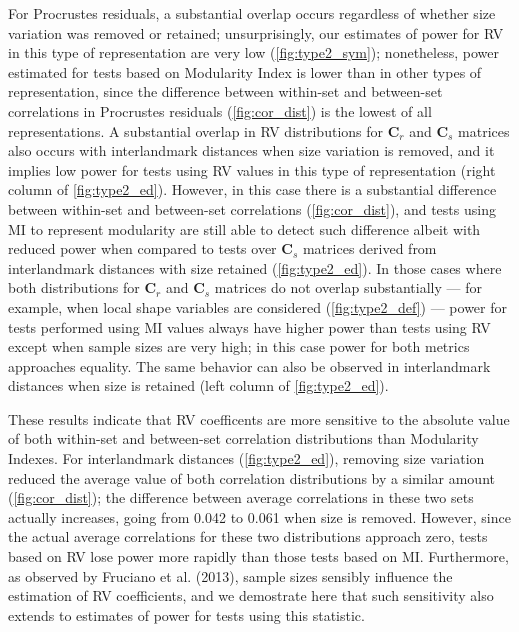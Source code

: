 \documentclass[12pt,]{article}
\begin{document}
For Procrustes residuals, a substantial overlap occurs regardless of
whether size variation was removed or retained; unsurprisingly, our
estimates of power for RV in this type of representation are very low
(\autoref{fig:type2_sym}); nonetheless, power estimated for tests based
on Modularity Index is lower than in other types of representation,
since the difference between within-set and between-set correlations in
Procrustes residuals (\autoref{fig:cor_dist}) is the lowest of all
representations. A substantial overlap in RV distributions for
$\mathbf{C}_r$ and $\mathbf{C}_s$ matrices also occurs with
interlandmark distances when size variation is removed, and it implies
low power for tests using RV values in this type of representation
(right column of \autoref{fig:type2_ed}). However, in this case there is
a substantial difference between within-set and between-set correlations
(\autoref{fig:cor_dist}), and tests using MI to represent modularity are
still able to detect such difference albeit with reduced power when
compared to tests over $\mathbf{C}_s$ matrices derived from
interlandmark distances with size retained (\autoref{fig:type2_ed}). In
those cases where both distributions for $\mathbf{C}_r$ and
$\mathbf{C}_s$ matrices do not overlap substantially --- for example,
when local shape variables are considered (\autoref{fig:type2_def}) ---
power for tests performed using MI values always have higher power than
tests using RV except when sample sizes are very high; in this case
power for both metrics approaches equality. The same behavior can also
be observed in interlandmark distances when size is retained (left
column of \autoref{fig:type2_ed}).

These results indicate that RV coefficents are more sensitive to the
absolute value of both within-set and between-set correlation
distributions than Modularity Indexes. For interlandmark distances
(\autoref{fig:type2_ed}), removing size variation reduced the average
value of both correlation distributions by a similar amount
(\autoref{fig:cor_dist}); the difference between average correlations in
these two sets actually increases, going from 0.042 to 0.061 when size
is removed. However, since the actual average correlations for these two
distributions approach zero, tests based on RV lose power more rapidly
than those tests based on MI. Furthermore, as observed by Fruciano et
al. (2013), sample sizes sensibly influence the estimation of RV
coefficients, and we demostrate here that such sensitivity also extends
to estimates of power for tests using this statistic.
\end{document}
